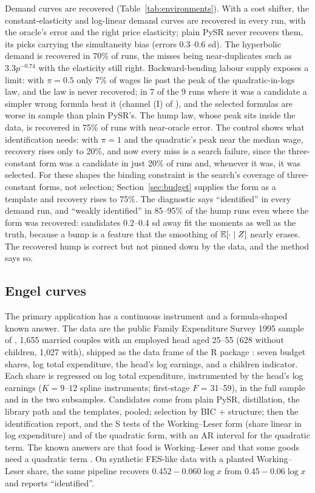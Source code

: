 Demand curves are recovered (Table~\ref{tab:environments}). With a cost shifter, the constant-elasticity and log-linear demand curves are recovered in every run, with the oracle's error and the right price elasticity; plain PySR never recovers them, its picks carrying the simultaneity bias (errors 0.3--0.6 sd). The hyperbolic demand is recovered in 70\% of runs, the misses being near-duplicates such as $3.3p^{-0.74}$ with the elasticity still right. Backward-bending labour supply exposes a limit: with $\pi = 0.5$ only 7\% of wages lie past the peak of the quadratic-in-logs law, and the law is never recovered; in 7 of the 9 runs where it was a candidate a simpler wrong formula beat it (channel (I) of ), and the selected formulas are worse in sample than plain PySR's. The hump law, whose peak sits inside the data, is recovered in 75\% of runs with near-oracle error. The control shows what identification needs: with $\pi = 1$ and the quadratic's peak near the median wage, recovery rises only to 20\%, and now every miss is a search failure, since the three-constant form was a candidate in just 20\% of runs and, whenever it was, it was selected. For these shapes the binding constraint is the search's coverage of three-constant forms, not selection; Section~\ref{sec:budget} supplies the form as a template and recovery rises to 75\%. The diagnostic says ``identified'' in every demand run, and ``weakly identified'' in 85--95\% of the hump runs even where the form was recovered: candidates 0.2--0.4 sd away fit the moments as well as the truth, because a bump is a feature that the smoothing of $\mathbb{E}[\cdot \mid Z]$ nearly erases. The recovered hump is correct but not pinned down by the data, and the method says so.

\subsection{Engel curves}
\label{sec:engel}

The primary application has a continuous instrument and a formula-shaped known answer. The data are the public Family Expenditure Survey 1995 sample of \citet{bck2007}, 1{,}655 married couples with an employed head aged 25--55 (628 without children, 1{,}027 with), shipped as the  data frame of the R package : seven budget shares, log total expenditure, the head's log earnings, and a children indicator. Each share is regressed on log total expenditure, instrumented by the head's log earnings ($K = 9$--$12$ spline instruments; first-stage $F$ = 31--59), in the full sample and in the two subsamples. Candidates come from plain PySR, distillation, the library path and the templates, pooled; selection by BIC + structure; then the identification report, and the S tests of the Working--Leser form (share linear in log expenditure) and of the quadratic form, with an AR interval for the quadratic term. The known answers are that food is Working--Leser and that some goods need a quadratic term \citep{bankslewbel1997}. On synthetic FES-like data with a planted Working--Leser share, the same pipeline recovers $0.452 - 0.060\log x$ from $0.45 - 0.06\log x$ and reports ``identified''.

